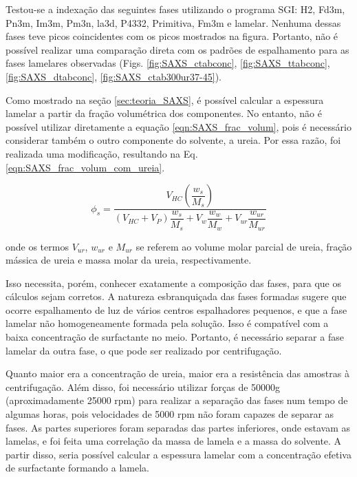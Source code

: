 	Testou-se a indexação das seguintes fases utilizando o programa SGI: H2, Fd3m, Pn3m, Im3m, Pm3n, la3d, P4332, Primitiva, Fm3m e lamelar. Nenhuma dessas fases teve picos coincidentes com os picos mostrados na figura. Portanto, não é possível realizar uma comparação direta com os padrões de espalhamento para as fases lamelares observadas (Figs. \ref{fig:SAXS_ctabconc}, \ref{fig:SAXS_ttabconc}, \ref{fig:SAXS_dtabconc}, \ref{fig:SAXS_ctab300ur37-45}).
	
	Como mostrado na seção \ref{sec:teoria_SAXS}, é possível calcular a espessura lamelar a partir da fração volumétrica dos componentes. No entanto, não é possível utilizar diretamente a equação \ref{eqn:SAXS_frac_volum}, pois é necessário considerar também o outro componente do solvente, a ureia. Por essa razão, foi realizada uma modificação, resultando na Eq. \ref{eqn:SAXS_frac_volum_com_ureia}.
	
	\begin{equation}
		\phi_s = \dfrac{V_{\textit{HC}}\left( \dfrac{w_{s}}{M_{s}} \right)}{\left( V_{\textit{HC}} + V_{P} \right)\dfrac{w_{s}}{M_{s}} + V_{w}\dfrac{w_{w}}{M_{w}} + V_{\textit{ur}}\dfrac{w_{\textit{ur}}}{M_{\textit{ur}}}}
		\label{eqn:SAXS_frac_volum_com_ureia}
	\end{equation}

	\noindent onde os termos \(V_{\textit{ur}}\), \(w_{\textit{ur}}\) e \(M_{\textit{ur}}\)	se referem ao volume molar parcial de ureia, fração mássica de ureia e massa molar da ureia, respectivamente.
	
	Isso necessita, porém, conhecer exatamente a composição das fases, para que os cálculos sejam corretos.	A natureza esbranquiçada das fases formadas sugere que ocorre espalhamento de luz de vários centros espalhadores pequenos, e que a fase lamelar não homogeneamente formada pela solução. Isso é compatível com a baixa concentração de surfactante no meio. Portanto, é necessário separar a fase lamelar da outra fase, o que pode ser realizado por centrifugação.
	
	                   
	Quanto maior era a concentração de ureia, maior era a resistência das amostras à centrifugação. Além disso, foi necessário utilizar forças de 50000g (aproximadamente 25000 rpm) para realizar a separação das fases num tempo de algumas horas, pois velocidades de 5000 rpm não foram capazes de separar as fases. As partes superiores foram separadas das partes inferiores, onde estavam as lamelas, e foi feita uma correlação da massa de lamela e a massa do solvente. A partir disso, seria possível calcular a espessura lamelar com a concentração efetiva de surfactante formando a lamela.
	

